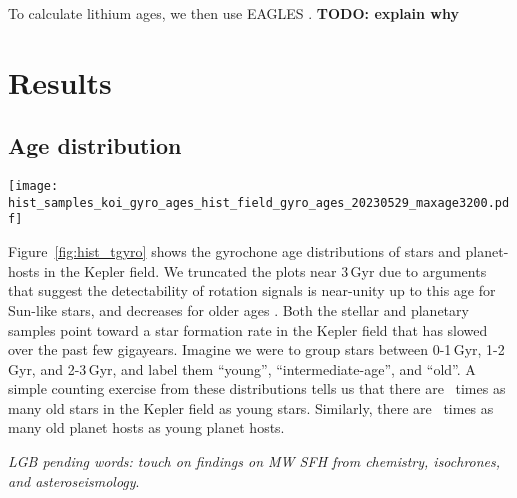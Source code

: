 \documentclass[11pt,twocolumn,tighten]{aastex63}
\begin{document}
To calculate lithium ages, we then use EAGLES \citep{Jeffries_2023}.
{\bf TODO: explain why}







\section{Results}
\label{sec:results}


\subsection{Age distribution}

\begin{figure*}[!t]
	\begin{center}
		\leavevmode
		\texttt{[image: hist\_samples\_koi\_gyro\_ages\_hist\_field\_gyro\_ages\_20230529\_maxage3200.pdf]}
	\end{center}
	\vspace{-0.6cm}
	\caption{
		{\bf Age distribution of stars and planet-hosts in the Kepler field
    inferred from rotation periods}.
    A histogram of samples from the age posteriors for all Kepler
    stars with reported rotation periods and temperatures is shown in
    light gray;
    the age calculation was actually valid for stars that meet the criteria
    discussed in Section~\ref{subsec:filters} (dark blue).
		\label{fig:hist_tgyro}
	}
\end{figure*}

Figure~\ref{fig:hist_tgyro} shows the gyrochone age distributions
of stars and planet-hosts in the Kepler field.
We truncated the plots near $3$\,Gyr due to arguments that suggest the
detectability of rotation signals is near-unity up to this age for Sun-like
stars, and decreases for older ages \citep{2022ApJ...937...94M}.
Both the stellar and planetary samples point toward a star
formation rate in the Kepler field that has slowed over the past
few gigayears.
Imagine we were to group stars between 0-1\,Gyr, 1-2\,Gyr, and 2-3\,Gyr, and 
label them ``young'', ``intermediate-age'', and ``old''.
A simple counting exercise from these distributions tells us that there are \ratioobtoybstars\ times as many 
old stars in the Kepler field as young stars.
Similarly, there are \ratioobtoybplanets\ times as many old planet hosts as
young planet hosts. 

{\it LGB pending words: touch on findings on MW SFH from chemistry,
isochrones, and asteroseismology}.
\end{document}

